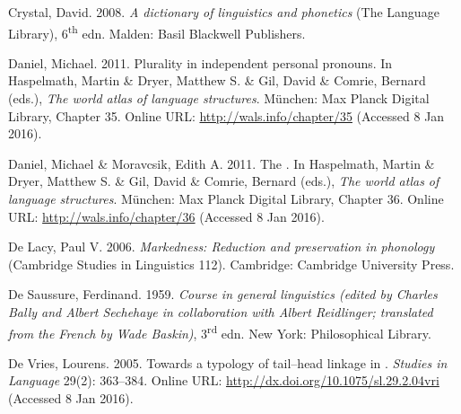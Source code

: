 \begin{styleCitaviBibliographyEntry}
Crystal, David. 2008. \textit{A dictionary of linguistics and phonetics} (The Language Library), 6\textsuperscript{th} edn. Malden: Basil Blackwell Publishers.
\end{styleCitaviBibliographyEntry}

\begin{styleCitaviBibliographyEntry}
Daniel, Michael. 2011. Plurality in independent personal pronouns. In Haspelmath, Martin \& Dryer, Matthew S. \& Gil, David \& Comrie, Bernard (eds.), \textit{The world atlas of language structures}. München: Max Planck Digital Library, Chapter 35. Online URL: \url{http://wals.info/chapter/35} (Accessed 8 Jan 2016).
\end{styleCitaviBibliographyEntry}

\begin{styleCitaviBibliographyEntry}
Daniel, Michael \& Moravcsik, Edith A. 2011. The . In Haspelmath, Martin \& Dryer, Matthew S. \& Gil, David \& Comrie, Bernard (eds.), \textit{The world atlas of language structures}. München: Max Planck Digital Library, Chapter 36. Online URL: \url{http://wals.info/chapter/36} (Accessed 8 Jan 2016).
\end{styleCitaviBibliographyEntry}

\begin{styleCitaviBibliographyEntry}
De Lacy, Paul V. 2006. \textit{Markedness: Reduction and preservation in phonology} (Cambridge Studies in Linguistics 112). Cambridge: Cambridge University Press.
\end{styleCitaviBibliographyEntry}

\begin{styleCitaviBibliographyEntry}
De Saussure, Ferdinand. 1959. \textit{Course in general linguistics (edited by Charles Bally and Albert Sechehaye in collaboration with Albert Reidlinger; translated from the French by Wade Baskin)}, 3\textsuperscript{rd} edn. New York: Philosophical Library.
\end{styleCitaviBibliographyEntry}

\begin{styleCitaviBibliographyEntry}
De Vries, Lourens. 2005. Towards a typology of tail–head linkage in . \textit{Studies in Language} 29(2): 363–384. Online URL: \url{http://dx.doi.org/10.1075/sl.29.2.04vri} (Accessed 8 Jan 2016).
\end{styleCitaviBibliographyEntry}

